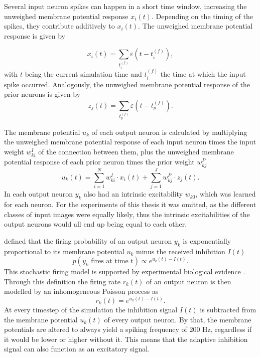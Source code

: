 Several input neuron spikes can happen in a short time window, increasing the unweighed membrane potential response $x_i(t)$. Depending on the timing of the spikes, they contribute additively to $x_i(t)$. The unweighed membrane potential response is given by

\begin{equation}
x_i(t) = \sum_{t_i^{(f)}} \varepsilon (t - t_i^{(f)}),
\end{equation}
with $t$ being the current simulation time and $t_i^{(f)}$ the time at which the input spike occurred.
Analogously, the unweighed membrane potential response of the prior neurons is given by
\begin{equation}
z_j(t) = \sum_{t_p^{(f)}} \varepsilon (t - t_p^{(f)}).
\end{equation}
 
The membrane potential $u_k$ of each output neuron is calculated by multiplying the unweighed membrane potential response of each input neuron times the input weight $w^{I}_{ki}$ of the connection between them, plus the unweighed membrane potential response of each prior neuron times the prior weight $w^{P}_{kj}$
\begin{equation}
\label{eqn:uk}
u_k(t) = \sum_{i=1}^N w^{I}_{ki} \cdot x_i(t) + \sum_{j=1}^J w^{P}_{kj} \cdot z_j(t).
\end{equation}
In \citet{nessler} each output neuron $y_k$ also had an intrinsic excitability $w_{k0}$, which was learned for each neuron. For the experiments of this thesis it was omitted, as the different classes of  input images were equally likely, thus the intrinsic excitabilities of the output neurons would all end up being equal to each other.

\citet{nessler} defined that the firing probability of an output neuron  $y_k$ is exponentially proportional to its membrane potential $u_k$ minus the received inhibition $I(t)$
\begin{equation}
\label{eqn:pVonY}
p(y_k \text{ fires at time t}) \propto e^{u_k(t) - I(t)}.
\end{equation}
This stochastic firing model is supported by experimental biological evidence \citep{woDasEHerkommt}. Through this definition the firing rate $r_k(t)$ of an output neuron is then modelled by an inhomogeneous Poisson process as
\begin{equation}
\label{eqn:rk}
r_k(t) = e^{u_k(t) - I(t)}.
\end{equation}
At every timestep of the simulation the inhibition signal $I(t)$ is subtracted from the membrane potential $u_k(t)$ of every output neuron. By that, the membrane potentials are altered to always yield a spiking frequency of 200 Hz, regardless if it would be lower or higher without it. This means that the adaptive inhibition signal can also function as an excitatory signal. 


